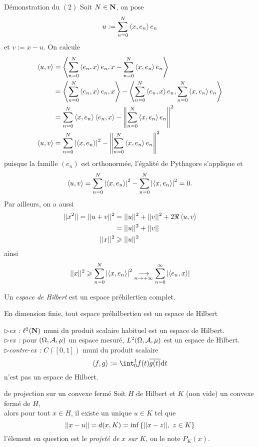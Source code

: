 \documentclass[a4paper,11pt, twoside]{article}
\begin{document}
\begin{ProofC}{Démonstration du $(\mathit 2)$}
  Soit $N\in\mathbf N$, on pose 
  $$u:=\sum_{n=0}^N\left\langle x,e_n \right\rangle e_n$$
  et $v:=x-u.$ On calcule
  \begin{align*}
    \left\langle u,v \right\rangle&=\left\langle \sum_{n=0}^N\left\langle e_n,x \right\rangle e_n,x-\sum_{n=0}^N\left\langle x,e_n \right\rangle e_n \right\rangle\\
    &=\left\langle \sum_{n=0}^N\left\langle e_n,x \right\rangle e_n,x \right\rangle-\left\langle \sum_{n=0}^N\left\langle e_n,x \right\rangle e_n,\sum_{n=0}^N\left\langle x,e_n \right\rangle e_n \right\rangle\\
    &=\sum_{n=0}^N\left\langle x,e_n \right\rangle\left\langle e_n,x \right\rangle-\left\lVert\sum_{n=0}^N\left\langle x,e_n \right\rangle e_n\right\rVert^2\\
    \left\langle u,v \right\rangle&=\sum_{n=0}^N\left| \left\langle x,e_n \right\rangle\right|^2-\left\lVert\sum_{n=0}^N\left\langle x,e_n \right\rangle e_n\right\rVert^2
  \end{align*}
  puisque la famille $(e_n)$ est orthonormée, l'égalité de Pythagore s'applique et 
  $$\left\langle u,v \right\rangle=\sum_{n=0}^N\left| \left\langle x,e_n \right\rangle\right|^2-\sum_{n=0}^N\left| \left\langle x,e_n \right\rangle\right|^2=0.$$
  Par ailleurs, on a aussi
  \begin{align*}
    ||x^2||=||u+v||^2&=||u||^2+||v||^2+2\Re\left\langle u,v \right\rangle\\
    &=||u||^2+||v||\\
    ||x||^2&\geqslant ||u||^2
  \end{align*}
  ainsi 
  $$||x||^2\geqslant \sum_{n=0}^N\left| \left\langle x,e_n \right\rangle\right|^2\underset{n\to+\infty}{\longrightarrow} \sum_{n=0}^\infty\left| \left\langle e_n,x \right\rangle\right|$$
\end{ProofC}




\begin{Def}
  Un \emph{espace de Hilbert} est un espace préhilertien complet.
\end{Def}


\begin{RQ}
  En dimension finie, tout espace préhilbertien est un espace de Hilbert
\end{RQ}


$\triangleright$\emph{ex : }$\ell^2(\mathbf N)$ muni du produit scalaire habituel est un espace de Hilbert.\\


$\triangleright$\emph{ex : }pour $(\Omega,\mathcal A,\mu)$ un espace mesuré, $L^2(\Omega,\mathcal A,\mu)$ est un espace de Hilbert.\\


$\triangleright$\emph{contre-ex : }$C([0,1])$ muni du produit scalaire 
$$\ps{f,g}:=\int_0^1f(t)\overline{g(t)}\dt$$
n'est pas un espace de Hilbert.


\begin{thC}{de projection sur un convexe fermé}
  Soit $H$ de Hilbert et $K$ (non vide) un convexe fermé de $H$,\\

  alors pour tout $x\in H$, il existe un unique $u\in K$ tel que 
  $$||x-u||=d(x,K)=\mathrm{inf}\left\{||x-z||,\ z\in K\right\}$$
  l'élement en question est le \emph{projeté de }$x$\emph{ sur }$K$, on le note $P_K(x).$
\end{thC}
\end{document}
